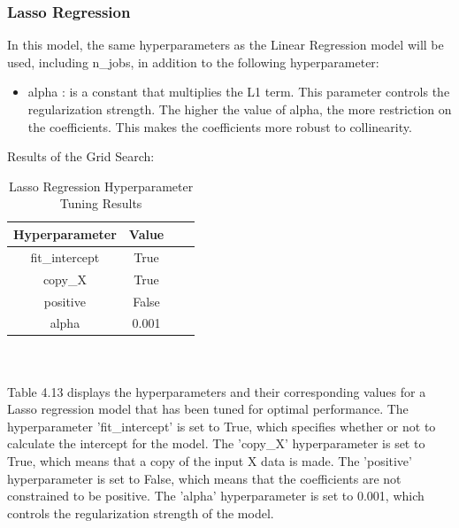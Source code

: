 \documentclass{report}
\begin{document}
\subsubsection{Lasso Regression}
In this model, the same hyperparameters as the Linear Regression model will be used, including n\_jobs, in addition to the following hyperparameter:
\begin{itemize}
    \item alpha : is a constant that multiplies the L1 term. This parameter controls the regularization strength. The higher the value of alpha, the more restriction on the coefficients. This makes the coefficients more robust to collinearity\cite{scikit-learn}. 
\end{itemize}
Results of the Grid Search:
\begin{table}[h]
\centering
\begin{tabular}{|c|c|c|c|}
\hline
\textbf{Hyperparameter} & \textbf{Value} \\ \hline
fit\_intercept & True \\ \hline
copy\_X & True \\ \hline
positive & False \\ \hline
alpha & 0.001 \\ \hline
\end{tabular}
\caption{Lasso Regression Hyperparameter Tuning Results}
\end{table}\\
\\
Table 4.13 displays the hyperparameters and their corresponding values for a Lasso regression model that has been tuned for optimal performance. The hyperparameter 'fit\_intercept' is set to True, which specifies whether or not to calculate the intercept for the model. The 'copy\_X' hyperparameter is set to True, which means that a copy of the input X data is made. The 'positive' hyperparameter is set to False, which means that the coefficients are not constrained to be positive. The 'alpha' hyperparameter is set to 0.001, which controls the regularization strength of the model. 
\end{document}
